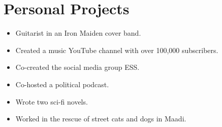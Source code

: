 \documentclass[10pt, letterpaper]{article}
\begin{document}
\section{Personal Projects}
\vspace{-1ex} %
\begin{itemize}[leftmargin=*, itemsep=0.5ex] %
    \item Guitarist in an Iron Maiden cover band.
    \item Created a music YouTube channel with over 100,000 subscribers.
    \item Co-created the social media group ESS.
    \item Co-hosted a political podcast.
    \item Wrote two sci-fi novels.
    \item Worked in the rescue of street cats and dogs in Maadi.
\end{itemize}
\end{document}
